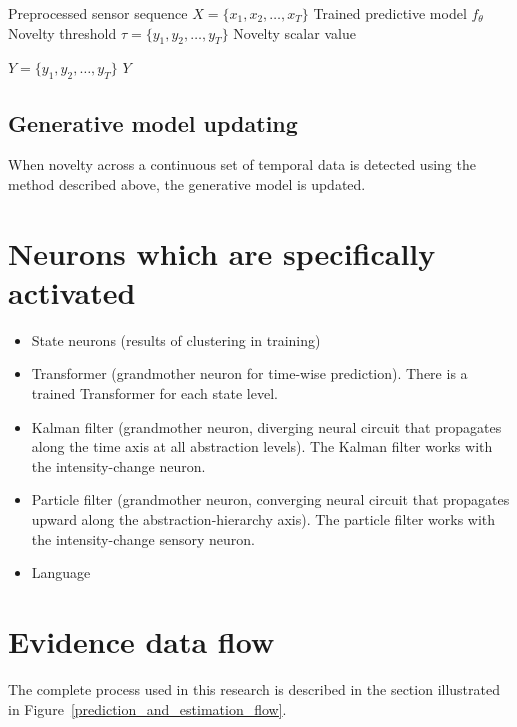 \documentclass[a4paper]{article}
\begin{document}
      \begin{algorithm}[H]
         \caption{Novelty Detection from Sensor Sequences}
         \begin{algorithmic}[1]
            \Require Preprocessed sensor sequence $X = \{x_1, x_2, \dots, x_T\}$
            \Require Trained predictive model $f_{\theta}$
            \Ensure Novelty threshold $\tau = \{y_1, y_2, \dots, y_T\}$
            \Ensure Novelty scalar value


            $Y = \{y_1, y_2, \dots, y_T\}$
            \State \Return $Y$
         \end{algorithmic}
      \end{algorithm}



      \subsection{Generative model updating}
         When novelty across a continuous set of temporal data is detected using the method described above, the generative model is updated.




   \section{Neurons which are specifically activated}
      \begin{itemize}
         \item State neurons (results of clustering in training)
         \item Transformer (grandmother neuron for time-wise prediction). There is a trained Transformer for each state level.
         \item Kalman filter (grandmother neuron, diverging neural circuit that propagates along the time axis at all abstraction levels). The Kalman filter works with the intensity-change neuron.
         \item Particle filter (grandmother neuron, converging neural circuit that propagates upward along the abstraction-hierarchy axis). The particle filter works with the intensity-change sensory neuron.
         \item Language
      \end{itemize}

   \section{Evidence data flow}
      The complete process used in this research is described in the section illustrated in Figure~\ref{prediction_and_estimation_flow}.
\end{document}
